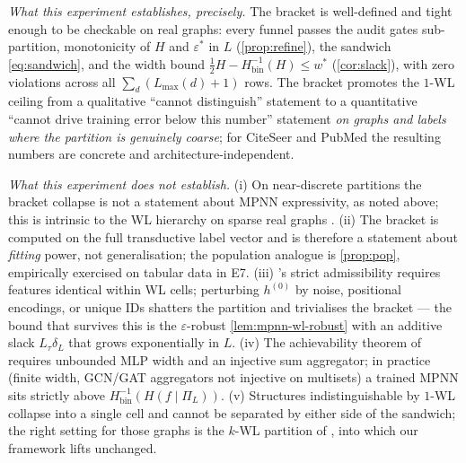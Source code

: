 \documentclass[10pt]{article}
\theoremstyle{definition}
\theoremstyle{remark}
\newcommand{\Hinv}{H_{\mathrm{bin}}^{-1}}
\newcommand{\eps}{\varepsilon}
\begin{document}
\emph{What this experiment establishes, precisely.} The
bracket is well-defined and tight enough to be checkable on
real graphs: every funnel passes the audit gates sub-partition,
monotonicity of $H$ and $\eps^{*}$ in $L$
(\cref{prop:refine}), the sandwich \eqref{eq:sandwich}, and the
width bound $\tfrac{1}{2} H - \Hinv(H) \le w^{*}$
(\cref{cor:slack}), with zero violations across all
$\sum_{d} (L_{\max}(d) + 1)$ rows. The bracket promotes the
$1$-WL ceiling from a qualitative ``cannot distinguish''
statement to a quantitative ``cannot drive training error below
this number'' statement \emph{on graphs and labels where the
partition is genuinely coarse}; for CiteSeer and PubMed the
resulting numbers are concrete and architecture-independent.

\emph{What this experiment does not establish.} (i) On
near-discrete partitions the bracket collapse is not a
statement about MPNN expressivity, as noted above; this is
intrinsic to the WL hierarchy on sparse real graphs
\citep{morris2019wl,arvind2015power}. (ii) The bracket is
computed on the full transductive label vector and is therefore
a statement about \emph{fitting} power, not generalisation; the
population analogue is \cref{prop:pop}, empirically exercised
on tabular data in E7. (iii) ’s strict
admissibility requires features identical within WL cells;
perturbing $h^{(0)}$ by noise, positional encodings, or unique
IDs shatters the partition and trivialises the bracket --- the
bound that survives this is the $\varepsilon$-robust
\cref{lem:mpnn-wl-robust} with an additive slack
$L_{\tau} \delta_{L}$ that grows exponentially in $L$. (iv) The
achievability theorem of \citet{xu2019gin} requires unbounded
MLP width and an injective sum aggregator; in practice (finite
width, GCN/GAT aggregators not injective on multisets) a
trained MPNN sits strictly above $\Hinv(H(f \mid \Pi_{L}))$.
(v) Structures indistinguishable by $1$-WL collapse into a
single cell and cannot be separated by either side of the
sandwich; the right setting for those graphs is the $k$-WL
partition of \citet[Sec.~5]{morris2019wl}, into which our
framework lifts unchanged.
\end{document}

